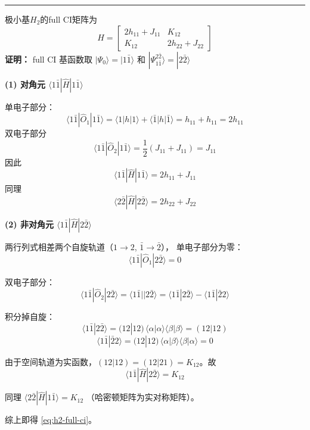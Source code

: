 \documentclass[fontset=none,12pt,a4paper]{ctexart}
\numberwithin{equation}{section}
\begin{document}
\vspace{1em}
\noindent\rule{\linewidth}{0.4pt}

极小基$H_2$的full CI矩阵为
\begin{equation}
\hat{H}=\begin{bmatrix}
  2h_{11}+J_{11}&K_{12} \\
  K_{12}&2h_{22}+J_{22}
\end{bmatrix}
\label{eq:h2-full-ci}
\end{equation}
\textbf{证明：} full CI 基函数取 $|\Psi_0\rangle=|1\bar{1}\rangle$ 和
$|\Psi_{1\bar{1}}^{2\bar{2}}\rangle=|2\bar{2}\rangle$

\medskip
\noindent\textbf{(1) 对角元 $\langle 1\bar{1}|\hat{H}|1\bar{1}\rangle$}

单电子部分：
\[
\langle 1\bar{1}|\hat{O}_1|1\bar{1}\rangle
= \langle 1|h|1\rangle + \langle \bar{1}|h|\bar{1}\rangle
= h_{11}+h_{11}=2h_{11}
\]
双电子部分
\[
\langle 1\bar{1}|\hat{O}_2|1\bar{1}\rangle
= \frac12(J_{11}+J_{11})=J_{11}
\]
因此
\[
\langle 1\bar{1}|\hat{H}|1\bar{1}\rangle = 2h_{11}+J_{11}
\]
同理
\[
\langle 2\bar{2}|\hat{H}|2\bar{2}\rangle = 2h_{22}+J_{22}
\]

\medskip
\noindent\textbf{(2) 非对角元 $\langle 1\bar{1}|\hat{H}|2\bar{2}\rangle$}

两行列式相差两个自旋轨道（$1\to2$, $\bar{1}\to\bar{2}$），
单电子部分为零：
\[
\langle 1\bar{1}|\hat{O}_1|2\bar{2}\rangle = 0
\]

双电子部分：
\[
\langle 1\bar{1}|\hat{O}_2|2\bar{2}\rangle
= \langle 1\bar{1}||2\bar{2}\rangle
= \langle 1\bar{1}|2\bar{2}\rangle - \langle 1\bar{1}|\bar{2}2\rangle
\]

积分掉自旋：
\[
\langle 1\bar{1}|2\bar{2}\rangle
= (12|12)\,\langle\alpha|\alpha\rangle\langle\beta|\beta\rangle
= (12|12)
\]
\[
\langle 1\bar{1}|\bar{2}2\rangle
= (12|12)\,\langle\alpha|\beta\rangle\langle\beta|\alpha\rangle = 0
\]

由于空间轨道为实函数，$(12|12)=(12|21)=K_{12}$。故
\[
\langle 1\bar{1}|\hat{H}|2\bar{2}\rangle = K_{12}
\]

同理 $\langle 2\bar{2}|\hat{H}|1\bar{1}\rangle = K_{12}$
（哈密顿矩阵为实对称矩阵）。

\smallskip
综上即得 \eqref{eq:h2-full-ci}。
\end{document}
